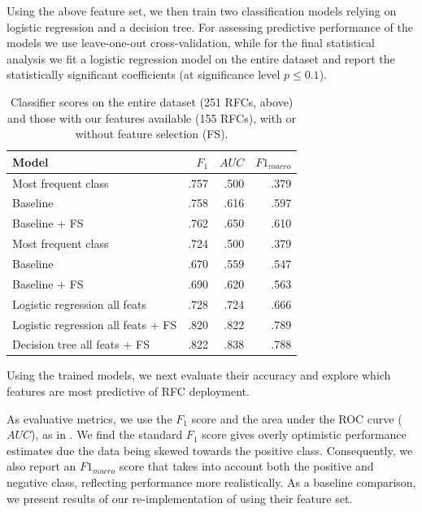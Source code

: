\documentclass[twocolumn,10pt]{article}
\newcommand{\pb}[1]{\vspace{0.75ex}\noindent{\textbf{#1}}}
\begin{document}
Using the above feature set, we then train two classification models relying
on logistic regression and a decision tree.  For assessing predictive
performance of the models we use leave-one-out cross-validation, while for
the final statistical analysis we fit a logistic regression model on the
entire dataset and report the statistically significant coefficients (at
significance level $p \leq 0.1$).




\begin{table}
  \centering
  \begin{tabular}{lrrr}
    \toprule
      Model & $F_1$ & $\mathit{AUC}$ & $F1_{macro}$ \\
    \midrule
      Most frequent class                & .757   & .500   & .379 \\
      Baseline                           & .758   & .616   & .597 \\
      Baseline + FS                      & .762   & .650   & .610 \\
    \midrule
      Most frequent class                & .724   & .500   & .379 \\
      Baseline                           & .670   & .559   & .547 \\
      Baseline + FS                      & .690   & .620   & .563 \\
      Logistic regression all feats      & .728   & .724   & .666 \\
      Logistic regression all feats + FS & .820   & .822   & .789 \\
      Decision tree all feats + FS       & .822   & .838   & .788 \\
    \bottomrule
  \end{tabular}
  \caption{
    Classifier scores on the entire dataset (251 RFCs, above) and those
    with our features available (155 RFCs), with or without feature
    selection (FS).
  }
  \label{tbl:mlres}
\end{table}


\pb{Evaluative Results:}
Using the trained models, we next evaluate their accuracy and explore which
features are most predictive of RFC deployment. 

As evaluative metrics, we use the $F_1$ score and the area under the ROC
curve ($AUC$), as in \cite{nikkhah2017statistical}. We find the standard
$F_1$ score gives overly optimistic performance estimates due the data
being skewed towards the positive class. Consequently, we also report an
$F1_{macro}$ score that takes into account both the positive and negative
class, reflecting performance more realistically. As a baseline comparison,
we present results of our re-implementation of \cite{nikkhah2017statistical}
using their feature set.
\end{document}
